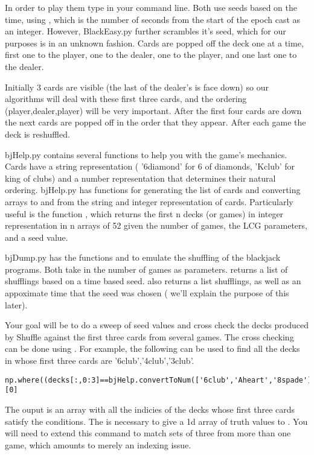 In order to play them type  in your command line.
Both use seeds based on the time, using , which is the number of seconds from the start of the epoch cast as an integer. However, BlackEasy.py further scrambles it's seed, which for our purposes is in an unknown fashion.
Cards are popped off the deck one at a time, first one to the player, one to the dealer, one to the player, and one last one to the dealer. 

Initially 3 cards are visible (the last of the dealer's is face down) so our algorithms will deal with these first three cards, and the ordering (player,dealer,player) will be very important. 
After the first four cards are down the next cards are popped off in the order that they appear. 
After each game the deck is reshuffled.

bjHelp.py contains several functions to help you with the game's mechanics.
 Cards have a string representation ( '6diamond' for 6 of diamonds, 'Kclub' for king of clubs) and a number representation that determines their natural ordering. 
bjHelp.py has functions for generating the list  of cards and converting arrays to and from the string and integer representation of cards. 
Particularly useful is the function , which returns the first n decks (or games) in integer representation in n arrays of 52 given the number of games, the LCG parameters, and a seed value.

bjDump.py has the functions  and  to emulate the shuffling of the blackjack programs. 
Both take in the number of games as parameters. 
 returns a list of shufflings based on a time based seed. 
 also returns a list shufflings, as well as an appoximate time that the seed was chosen ( we'll explain the purpose of this later).

Your goal will be to do a sweep of seed values and cross check the decks produced by Shuffle against the first three cards from several games. 
The cross checking can be done using . 
For example, the following can be used to find all the decks in  whose first three cards are '6club','4club','3club'.

\begin{lstlisting}
np.where((decks[:,0:3]==bjHelp.convertToNum(['6club','Aheart','8spade'])).all(axis=1))[0]
\end{lstlisting}

The ouput is an array with all the indicies of the decks whose first three cards satisfy the conditions. 
The  is necessary to give a 1d array of truth values to .
You will need to extend this command to match sets of three from more than one game, which amounts to merely an indexing issue.


